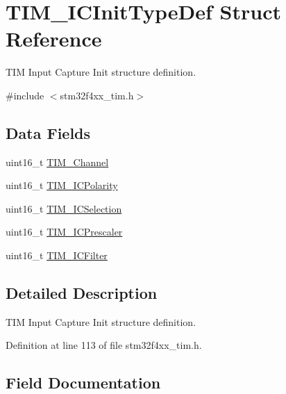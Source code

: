 \hypertarget{struct_t_i_m___i_c_init_type_def}{}\section{T\+I\+M\+\_\+\+I\+C\+Init\+Type\+Def Struct Reference}
\label{struct_t_i_m___i_c_init_type_def}


T\+IM Input Capture Init structure definition.  




{\ttfamily \#include $<$stm32f4xx\+\_\+tim.\+h$>$}

\subsection*{Data Fields}
\begin{DoxyCompactItemize}
\item 
uint16\+\_\+t \hyperlink{struct_t_i_m___i_c_init_type_def_ac736e711f51054bef8b486b8521ef611}{T\+I\+M\+\_\+\+Channel}
\item 
uint16\+\_\+t \hyperlink{struct_t_i_m___i_c_init_type_def_a71dc0cc2f4eb59451ea323719b0741bb}{T\+I\+M\+\_\+\+I\+C\+Polarity}
\item 
uint16\+\_\+t \hyperlink{struct_t_i_m___i_c_init_type_def_a052908740c8c618054ef82b3ec89e9b3}{T\+I\+M\+\_\+\+I\+C\+Selection}
\item 
uint16\+\_\+t \hyperlink{struct_t_i_m___i_c_init_type_def_abdff50beb0809a640ccf2cebde439a00}{T\+I\+M\+\_\+\+I\+C\+Prescaler}
\item 
uint16\+\_\+t \hyperlink{struct_t_i_m___i_c_init_type_def_a751574b5d1f66bea6c3405d2975e420a}{T\+I\+M\+\_\+\+I\+C\+Filter}
\end{DoxyCompactItemize}


\subsection{Detailed Description}
T\+IM Input Capture Init structure definition. 

Definition at line 113 of file stm32f4xx\+\_\+tim.\+h.



\subsection{Field Documentation}
\mbox{\label{struct_t_i_m___i_c_init_type_def_ac736e711f51054bef8b486b8521ef611}} 
